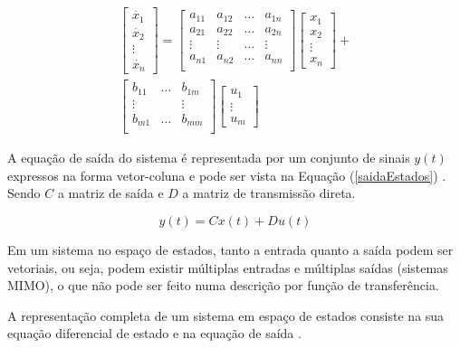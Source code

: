 \documentclass[journal,brazil,english]{IEEEtran}
\begin{document}
\begin{equation}\label{matrizEstados}
\begin{matrix}
\begin{bmatrix}
\dot{x_1} \\
\dot{x_2} \\
\vdots \\
\dot{x_n}
\end{bmatrix}
=
\begin{bmatrix}
a_{11} & a_{12} & \ldots & a_{1n} \\
a_{21} & a_{22} & \ldots & a_{2n} \\
\vdots & \vdots & \ldots & \vdots \\
a_{n1} & a_{n2} & \ldots & a_{nn} \\
\end{bmatrix}
\begin{bmatrix}
{x_1} \\
{x_2} \\
\vdots \\
{x_n}
\end{bmatrix}
+ \\
\begin{bmatrix}
b_{11} & \ldots & b_{1m} \\
\vdots &	    & \vdots \\
b_{m1} & \ldots & b_{mm} \\
\end{bmatrix}
\begin{bmatrix}
{u_1} \\
\vdots \\
{u_m}
\end{bmatrix}
\end{matrix}
\end{equation}

A equação de saída do sistema é representada por um conjunto de sinais $y(t)$ expressos na forma vetor-coluna e pode ser vista na Equação (\ref{saidaEstados}) \cite{dorf}. Sendo $C$ a matriz de saída e $D$ a matriz de transmissão direta.

\begin{equation}\label{saidaEstados}
y(t) = Cx(t) + Du(t)
\end{equation}

Em um sistema no espaço de estados, tanto a entrada quanto a saída podem ser vetoriais, ou seja, podem existir múltiplas entradas e múltiplas saídas (sistemas MIMO), o que não pode ser feito numa descrição por função de transferência.

A representação completa de um sistema em espaço de estados consiste na sua equação diferencial de estado e na equação de saída \cite{dorf}.
\end{document}
